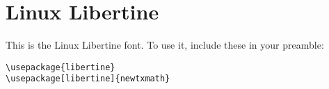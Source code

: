 \documentclass{article}
\begin{document}
\section*{Linux Libertine}
This is the Linux Libertine font.
To use it, include these in your preamble:
\begin{verbatim}
\usepackage{libertine}
\usepackage[libertine]{newtxmath}
\end{verbatim}


\end{document}
